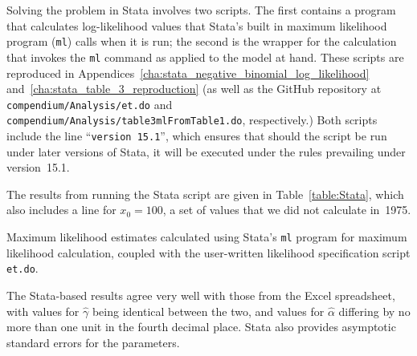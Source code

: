 	Solving the problem in Stata involves two scripts.  The first contains a program that calculates log-likelihood values that Stata's built in maximum likelihood program (\texttt{ml}) calls when it is run; the second is the wrapper for the calculation that invokes the \texttt{ml} command as applied to the model at hand.  These scripts are reproduced in Appendices~\ref{cha:stata_negative_binomial_log_likelihood} and~\ref{cha:stata_table_3_reproduction} (as well as the GitHub repository at \texttt{compendium/Analysis/et.do} and \texttt{compendium/Analysis/table3mlFromTable1.do}, respectively.)  Both scripts include the line ``\texttt{version 15.1}'', which ensures that should the script be run under later versions of Stata, it will be executed under the rules prevailing under version~15.1.
	
	The results from running the Stata script are given in Table~\ref{table:Stata}, which also includes a line for $x_0=100$, a set of values that we did not calculate in~1975.
	
\begin{table}
	\centering
	
	\caption{Maximum likelihood estimates calculated using Stata's \texttt{ml} program for maximum likelihood calculation, coupled with the user-written likelihood specification script \texttt{et.do}.}\label{table:Stata}
\end{table}
	
	The Stata-based results agree very well with those from the Excel spreadsheet, with values for $\hat\gamma$ being identical between the two, and values for $\hat\alpha$ differing by no more than one unit in the fourth decimal place.  Stata also provides asymptotic standard errors for the parameters.


